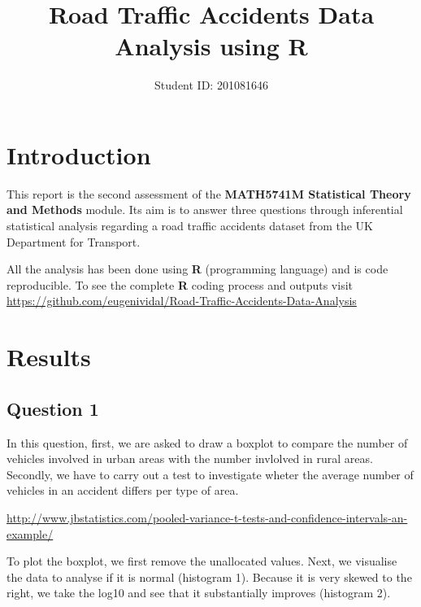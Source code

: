 \documentclass[]{article}
\title{Road Traffic Accidents Data Analysis using R}
\author{Student ID: 201081646}
\date{}
\newenvironment{Shaded}{\begin{snugshade}}{\end{snugshade}}
\newcommand{\KeywordTok}[1]{\textcolor[rgb]{0.13,0.29,0.53}{\textbf{{#1}}}}
\newcommand{\CommentTok}[1]{\textcolor[rgb]{0.56,0.35,0.01}{\textit{{#1}}}}
\newcommand{\NormalTok}[1]{{#1}}
\begin{document}
\maketitle

\section{Introduction}\label{introduction}

This report is the second assessment of the \textbf{MATH5741M
Statistical Theory and Methods} module. Its aim is to answer three
questions through inferential statistical analysis regarding a road
traffic accidents dataset from the UK Department for Transport.

All the analysis has been done using \textbf{R} (programming language)
and is code reproducible. To see the complete \textbf{R} coding process
and outputs visit
\url{https://github.com/eugenividal/Road-Traffic-Accidents-Data-Analysis}

\section{Results}\label{results}

\subsection{Question 1}\label{question-1}

In this question, first, we are asked to draw a boxplot to compare the
number of vehicles involved in urban areas with the number invlolved in
rural areas. Secondly, we have to carry out a test to investigate wheter
the average number of vehicles in an accident differs per type of area.

\url{http://www.jbstatistics.com/pooled-variance-t-tests-and-confidence-intervals-an-example/}

To plot the boxplot, we first remove the unallocated values. Next, we
visualise the data to analyse if it is normal (histogram 1). Because it
is very skewed to the right, we take the log10 and see that it
substantially improves (histogram 2).

\begin{Shaded}
\end{Shaded}
\end{document}
